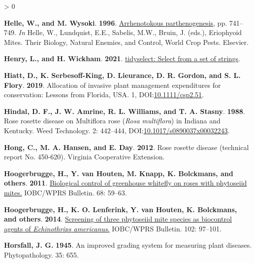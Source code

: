 \documentclass{ufdissertation}[overrideChapters] %
\newlength{\cslhangindent}
\newenvironment{CSLReferences}[2] %
 {%
  \setlength{\parindent}{0pt}
  \ifodd #1 \everypar{\setlength{\hangindent}{\cslhangindent}}\ignorespaces\fi
  \ifnum #2 > 0
  \setlength{\parskip}{#2\baselineskip}
  \fi
 }%
 {}
\begin{document}
{\begin{CSLReferences}{1}{1}
\leavevmode{}%
\textbf{Helle, W., and M. Wysoki}. \textbf{1996}. \href{https://doi.org/10.1016/s1572-4379(96)80050-9}{Arrhenotokous parthenogenesis}, pp. 741--749. \emph{In} Helle, W., Lundquist, E.E., Sabelis, M.W., Bruin, J. (eds.), Eriophyoid Mites. Their Biology, Natural Enemies, and Control, World Crop Pests. Elsevier.

\leavevmode{}%
\textbf{Henry, L., and H. Wickham}. \textbf{2021}. \href{https://CRAN.R-project.org/package=tidyselect}{{tidyselect:} Select from a set of strings}.

\leavevmode{}%
\textbf{Hiatt, D., K. Serbesoff-King, D. Lieurance, D. R. Gordon, and S. L. Flory}. \textbf{2019}. Allocation of invasive plant management expenditures for conservation: Lessons from {Florida}, {USA}. 1, DOI:\href{https://doi.org/10.1111/csp2.51}{10.1111/csp2.51}.

\leavevmode{}%
\textbf{Hindal, D. F., J. W. Amrine, R. L. Williams, and T. A. Stasny}. \textbf{1988}. {Rose rosette disease} on {Multiflora rose} ({\emph{Rosa multiflora}}) in {Indiana} and {Kentucky}. Weed Technology. 2: 442--444, DOI:\href{https://doi.org/10.1017/s0890037x00032243}{10.1017/s0890037x00032243}.

\leavevmode{}%
\textbf{Hong, C., M. A. Hansen, and E. Day}. \textbf{2012}. {Rose rosette disease} (technical report No. 450-620). Virginia Cooperative Extension.

\leavevmode{}%
\textbf{Hoogerbrugge, H., Y. van Houten, M. Knapp, K. Bolckmans, and others}. \textbf{2011}. \href{http://www.iobc-wprs.org/pub/bulletins/bulletin_2011_68_table_of_contents_abstracts.pdf}{Biological control of greenhouse whitefly on roses with phytoseiid mites.} IOBC/WPRS Bulletin. 68: 59--63.

\leavevmode{}%
\textbf{Hoogerbrugge, H., K. O. Lenferink, Y. van Houten, K. Bolckmans, and others}. \textbf{2014}. \href{http://www.iobc-wprs.org/pub/bulletins/bulletin_2014_102_table_of_contents_abstracts.pdf}{Screening of three phytoseiid mite species as biocontrol agents of {\emph{Echinothrips americanus}}.} IOBC/WPRS Bulletin. 102: 97--101.

\leavevmode{}%
\textbf{Horsfall, J. G.} \textbf{1945}. An improved grading system for measuring plant diseases. Phytopathology. 35: 655.


\end{CSLReferences}}
\end{document}
